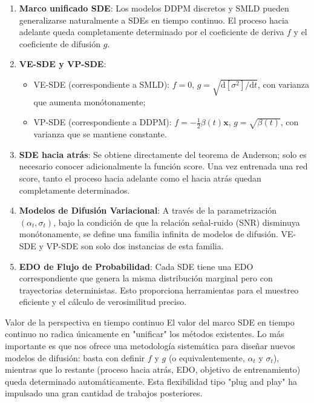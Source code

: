 \documentclass[a4paper]{article}
\begin{document}
\begin{enumerate}
    \item \textbf{Marco unificado SDE}: Los modelos DDPM discretos y SMLD pueden generalizarse naturalmente a SDEs en tiempo continuo. El proceso hacia adelante queda completamente determinado por el coeficiente de deriva $f$ y el coeficiente de difusión $g$.

    \item \textbf{VE-SDE y VP-SDE}:
    \begin{itemize}
        \item VE-SDE (correspondiente a SMLD): $f = 0$, $g = \sqrt{\mathrm{d}[\sigma^2]/\mathrm{d}t}$, con varianza que aumenta monótonamente;
        \item VP-SDE (correspondiente a DDPM): $f = -\frac{1}{2}\beta(t)\mathbf{x}$, $g = \sqrt{\beta(t)}$, con varianza que se mantiene constante.
    \end{itemize}

    \item \textbf{SDE hacia atrás}: Se obtiene directamente del teorema de Anderson; solo es necesario conocer adicionalmente la función score. Una vez entrenada una red score, tanto el proceso hacia adelante como el hacia atrás quedan completamente determinados.

    \item \textbf{Modelos de Difusión Variacional}: A través de la parametrización $(\alpha_t, \sigma_t)$, bajo la condición de que la relación señal-ruido (SNR) disminuya monótonamente, se define una familia infinita de modelos de difusión. VE-SDE y VP-SDE son solo dos instancias de esta familia.

    \item \textbf{EDO de Flujo de Probabilidad}: Cada SDE tiene una EDO correspondiente que genera la misma distribución marginal pero con trayectorias deterministas. Esto proporciona herramientas para el muestreo eficiente y el cálculo de verosimilitud preciso.
\end{enumerate}

\begin{importantbox}{Valor de la perspectiva en tiempo continuo}
El valor del marco SDE en tiempo continuo no radica únicamente en "unificar" los métodos existentes. Lo más importante es que nos ofrece una metodología sistemática para diseñar nuevos modelos de difusión: basta con definir $f$ y $g$ (o equivalentemente, $\alpha_t$ y $\sigma_t$), mientras que lo restante (proceso hacia atrás, EDO, objetivo de entrenamiento) queda determinado automáticamente. Esta flexibilidad tipo "plug and play" ha impulsado una gran cantidad de trabajos posteriores.
\end{importantbox}
\end{document}
